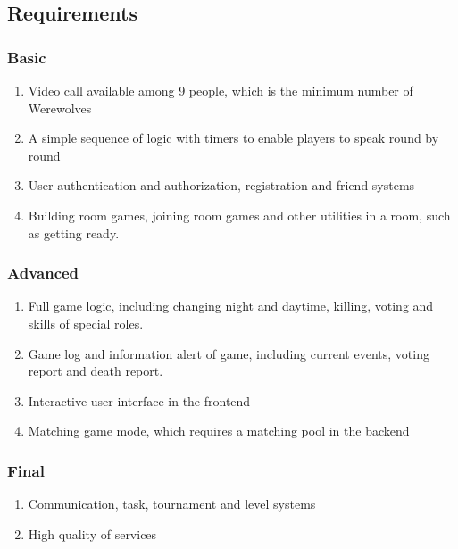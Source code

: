 \documentclass[11pt]{article}
\begin{document}
\subsection{Requirements}
\subsubsection{Basic}
\begin{enumerate}
\item
Video call available among 9 people, which is the minimum number of Werewolves
\item
A simple sequence of logic with timers to enable players to speak round by round
\item
User authentication and authorization, registration and friend systems
\item
Building room games, joining room games and other utilities in a room, such as getting ready.
\end{enumerate}

\subsubsection{Advanced}
\begin{enumerate}
\item
Full game logic, including changing night and daytime, killing, voting and skills of special roles.
\item
Game log and information alert of game, including current events, voting report and death report.
\item
Interactive user interface in the frontend
\item
Matching game mode, which requires a matching pool in the backend
\end{enumerate}

\subsubsection{Final}
\begin{enumerate}
\item
Communication, task, tournament and level systems
\item
High quality of services
\end{enumerate}


\end{document}
